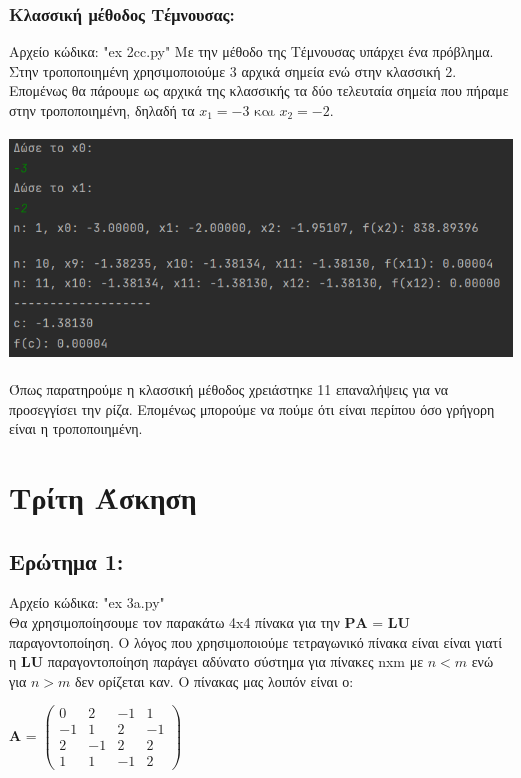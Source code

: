 \documentclass{article}
\begin{document}
    \subsubsection{Κλασσική μέθοδος Tέμνουσας:}
    Αρχείο κώδικα: "ex 2cc.py"
    Με την μέθοδο της Τέμνουσας υπάρχει ένα πρόβλημα. Στην τροποποιημένη χρησιμοποιούμε 3 αρχικά σημεία ενώ στην κλασσική 2. Επομένως θα πάρουμε ως αρχικά της κλασσικής τα δύο τελευταία σημεία που πήραμε στην τροποποιημένη, δηλαδή τα \(x_1 = -3 \text{ και } x_2 = -2\). \\
    \begin{center}\includegraphics[height = 6cm]{images/results_24.png}\end{center}
    Όπως παρατηρούμε η κλασσική μέθοδος χρειάστηκε 11 επαναλήψεις για να προσεγγίσει την ρίζα. Επομένως μπορούμε να πούμε ότι είναι περίπου όσο γρήγορη είναι η τροποποιημένη.

\pagebreak
\section{Τρίτη Άσκηση}

\subsection{Ερώτημα 1:}

Αρχείο κώδικα: "ex 3a.py" \\

Θα χρησιμοποίησουμε τον παρακάτω 4x4 πίνακα για την \(\textbf{PA = LU}\) παραγοντοποίηση. Ο λόγος που χρησιμοποιούμε τετραγωνικό πίνακα είναι είναι γιατί η \textbf{LU} παραγοντοποίηση παράγει αδύνατο σύστημα για πίνακες nxm με \(n < m\) ενώ για \(n > m\) δεν ορίζεται καν. Ο πίνακας μας λοιπόν είναι ο:

\begin{center}
\textbf{A} =
$\begin{pmatrix}
0 & 2 & -1 & 1\\
-1 & 1 & 2 & -1\\
2 & -1 & 2 & 2\\
1 &  1 & -1 & 2  
\end{pmatrix}$
\end{center}
\end{document}
